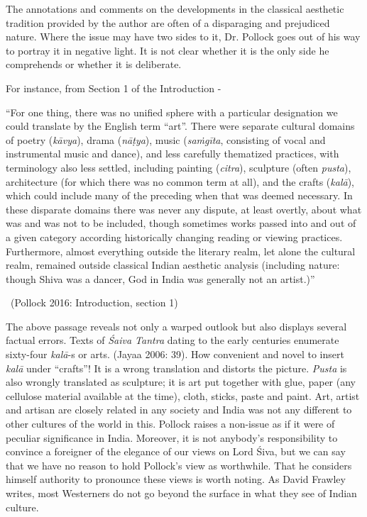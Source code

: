 The annotations and comments on the developments in the classical aesthetic tradition provided by the author are often of a disparaging and prejudiced nature. Where the issue may have two sides to it, Dr. Pollock goes out of his way to portray it in negative light. It is not clear whether it is the only side he comprehends or whether it is deliberate.

For instance, from Section 1 of the Introduction -

\begin{myquote}
“For one thing, there was no unified sphere with a particular designation we could translate by the English term “art”. There were separate cultural domains of poetry (\textit{kāvya}), drama (\textit{nāṭya}), music (\textit{saṁgīta}, consisting of vocal and instrumental music and dance), and less carefully thematized practices, with terminology also less settled, including painting (\textit{citra}), sculpture (often \textit{pusta}), architecture (for which there was no common term at all), and the crafts (\textit{kalā}), which could include many of the preceding when that was deemed necessary. In these disparate domains there was never any dispute, at least overtly, about what was and was not to be included, though sometimes works passed into and out of a given category according historically changing reading or viewing practices. Furthermore, almost everything outside the literary realm, let alone the cultural realm, remained outside classical Indian aesthetic analysis (including nature: though Shiva was a dancer, God in India was generally not an artist.)” 

~\hfill (Pollock 2016: Introduction, section 1)
\end{myquote}

The above passage reveals not only a warped outlook but also displays several factual errors. Texts of \textit{Śaiva Tantra} dating to the early centuries enumerate sixty-four \textit{kalā}-s or arts. (Jayaa 2006: 39). How convenient and novel to insert \textit{kalā} under “crafts”! It is a wrong translation and distorts the picture. \textit{Pusta} is also wrongly translated as sculpture; it is art put together with glue, paper (any cellulose material available at the time), cloth, sticks, paste and paint. Art, artist and artisan are closely related in any society and India was not any different to other cultures of the world in this. Pollock raises a non-issue as if it were of peculiar significance in India. Moreover, it is not anybody’s responsibility to convince a foreigner of the elegance of our views on Lord Śiva, but we can say that we have no reason to hold Pollock’s view as worthwhile. That he considers himself authority to pronounce these views is worth noting. As David Frawley writes, most Westerners do not go beyond the surface in what they see of Indian culture.

